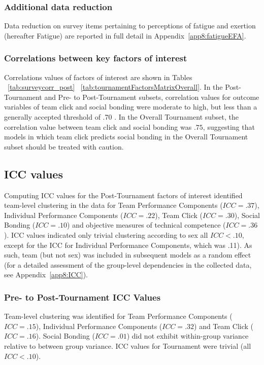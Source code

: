 \begin{CJK}{UTF8}{gbsn}
\subsubsection{Additional data reduction}
Data reduction on survey items pertaining to perceptions of fatigue and exertion (hereafter Fatigue) are reported in full detail in Appendix~\ref{app8:fatigueEFA}.


\subsubsection{Correlations between key factors of interest}
Correlations values of factors of interest are shown in Tables ~\ref{tab:surveycorr_post} \nobreakdash ~\ref{tab:tournamentFactorsMatrixOverall}.  In the Post-Tournament and Pre- to Post-Tournament subsets, correlation values for outcome variables of team click and social bonding were moderate to high, but less than a generally accepted threshold of .70 \citep{Field2012}.  In the Overall Tournament subset, the correlation value between team click and social bonding was $.75$, suggesting that models in which team click predicts social bonding in the Overall Tournament subset should be treated with caution.








\subsection{ICC values}

Computing ICC values for the Post-Tournament factors of interest identified team-level clustering in the data for Team Performance Components ($ICC = .37$), Individual Performance Components ($ICC = .22$), Team Click ($ICC = .30$), Social Bonding ($ICC = .10$) and objective measures of technical competence ($ICC = .36$).  ICC values indicated only trivial clustering according to sex all $ICC < .10$, except for the ICC for Individual Performance Components, which was .11).  As such, team (but not sex) was included in subsequent models as a random effect (for a detailed assessment of the group-level dependencies in the collected data, see Appendix~\ref{app8:ICC}).


\subsubsection{Pre- to Post-Tournament ICC Values}
Team-level clustering was identified for
Team Performance Components ($ICC = .15$), Individual Performance Components ($ICC = .32$) and Team Click ($ICC = .16$).  Social Bonding ($ICC = .01$) did not exhibit within-group variance relative to between group variance. ICC values for Tournament were trivial (all $ICC < .10$).


\end{CJK}
